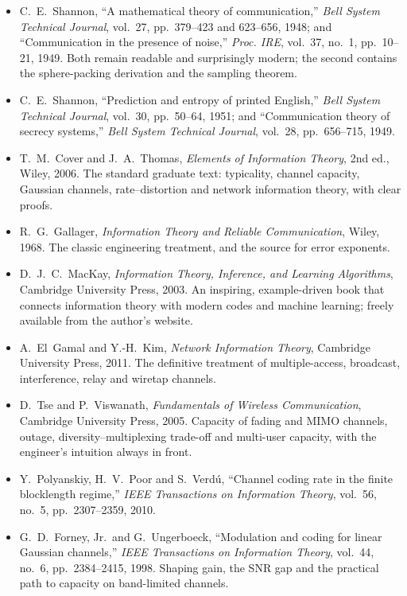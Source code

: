 \furtherreading
\begin{itemize}
\item C.~E.~Shannon, ``A mathematical theory of communication,'' \emph{Bell System Technical Journal},
vol.~27, pp.~379--423 and 623--656, 1948; and ``Communication in the presence of noise,''
\emph{Proc. IRE}, vol.~37, no.~1, pp.~10--21, 1949. Both remain readable and surprisingly modern;
the second contains the sphere-packing derivation and the sampling theorem.
\item C.~E.~Shannon, ``Prediction and entropy of printed English,'' \emph{Bell System Technical
Journal}, vol.~30, pp.~50--64, 1951; and ``Communication theory of secrecy systems,'' \emph{Bell
System Technical Journal}, vol.~28, pp.~656--715, 1949.
\item T.~M.~Cover and J.~A.~Thomas, \emph{Elements of Information Theory}, 2nd ed., Wiley, 2006. The
standard graduate text: typicality, channel capacity, Gaussian channels, rate--distortion and network
information theory, with clear proofs.
\item R.~G.~Gallager, \emph{Information Theory and Reliable Communication}, Wiley, 1968. The classic
engineering treatment, and the source for error exponents.
\item D.~J.~C.~MacKay, \emph{Information Theory, Inference, and Learning Algorithms}, Cambridge
University Press, 2003. An inspiring, example-driven book that connects information theory with
modern codes and machine learning; freely available from the author's website.
\item A.~El~Gamal and Y.-H.~Kim, \emph{Network Information Theory}, Cambridge University Press, 2011.
The definitive treatment of multiple-access, broadcast, interference, relay and wiretap channels.
\item D.~Tse and P.~Viswanath, \emph{Fundamentals of Wireless Communication}, Cambridge University
Press, 2005. Capacity of fading and MIMO channels, outage, diversity--multiplexing trade-off and
multi-user capacity, with the engineer's intuition always in front.
\item Y.~Polyanskiy, H.~V.~Poor and S.~Verd\'u, ``Channel coding rate in the finite blocklength
regime,'' \emph{IEEE Transactions on Information Theory}, vol.~56, no.~5, pp.~2307--2359, 2010.
\item G.~D.~Forney, Jr.\ and G.~Ungerboeck, ``Modulation and coding for linear Gaussian channels,''
\emph{IEEE Transactions on Information Theory}, vol.~44, no.~6, pp.~2384--2415, 1998. Shaping gain,
the SNR gap and the practical path to capacity on band-limited channels.

\end{itemize}
